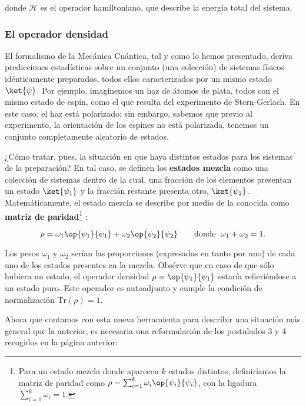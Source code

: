 \documentclass[11pt,a4paper,twoside,pdf]{article}
\numberwithin{equation}{section}
\begin{document}
			donde $\mathcal{H}$ es el operador hamiltoniano, que describe la energía total del sistema.
			\\
		
		\subsubsection{El operador densidad} \label{subsubsec: densidad}
			  
		El formalismo de la Mecánica Cuántica, tal y como lo hemos presentado, deriva predicciones estadísticas sobre un conjunto (una colección) de sistemas físicos idénticamente preparados, todos ellos caracterizados por un mismo estado $\ket{\psi}$. Por ejemplo, imaginemos un haz de átomos de plata, todos con el mismo estado de espín, como el que resulta del experimento de Stern-Gerlach. En este caso, el haz está polarizado; sin embargo, sabemos que previo al experimento, la orientación de los espines no está polarizada, tenemos un conjunto completamente aleatorio de estados.
		
		¿Cómo tratar, pues,  la situación en que haya distintos estados para los sistemas de la preparación? En tal caso, se definen los \textbf{estados mezcla} como una colección de sistemas dentro de la cual, una fracción de los elementos presentan un estado $\ket{\psi_1}$ y la fracción restante presenta otro, $\ket{\psi_2}$.	Matemáticamente, el estado mezcla se describe por medio de la conocida como \textbf{matriz de paridad}\footnote{ Para un estado mezcla donde aparecen $k$ estados distintos, definiríamos la matriz de paridad como $\rho = \sum_{i=1}^k \omega_i \op{\psi_i}{\psi_i}$, con la ligadura $\sum_{i=1}^k \omega_i=1$.} : 
		
			\begin{equation}\label{eq: Paridad}
				\rho=\omega_1 \op{\psi_1}{\psi_1} + \omega_2 \op{\psi_2}{\psi_2}  \qquad \text{donde } \; \omega_1+\omega_2=1 .
			\end{equation}
		
		Los pesos $\omega_1$ y $\omega_2$ serían las proporciones (expresadas en tanto por uno) de cada uno de los estados presentes en la mezcla. Obsérve que en caso de que sólo hubiera un estado, el operador densidad $\rho=\op{\psi_1}{\psi_1}$ estaría refieriéndose a un estado puro. Este operador es autoadjunto y cumple la condición de normalización $\text{Tr}(\rho)=1$.
		
		Ahora que contamos con esta nueva herramienta para describir una situación más general que la anterior, es necesaria una reformulación de los postulados 3 y 4 recogidos en la página anterior:
		
\end{document}
